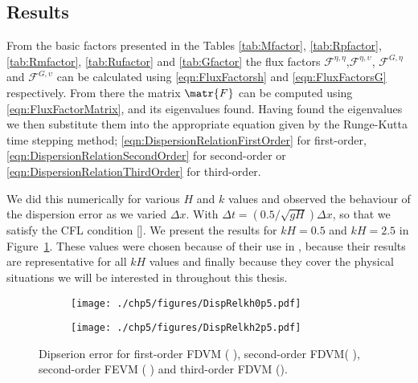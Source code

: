 \subsection{Results}
From the basic factors presented in the Tables \ref{tab:Mfactor}, \ref{tab:Rpfactor}, \ref{tab:Rmfactor}, \ref{tab:Rufactor} and \ref{tab:Gfactor} the flux factors $\mathcal{F}^{\eta,\eta}$,$\mathcal{F}^{\eta,\upsilon}$, $\mathcal{F}^{G,\eta}$ and $\mathcal{F}^{G,\upsilon}$
can be calculated using \eqref{eqn:FluxFactorsh} and \eqref{eqn:FluxFactorsG} respectively. From there the matrix $\matr{F}$ can be computed using \eqref{eqn:FluxFactorMatrix}, and its eigenvalues found. Having found the eigenvalues we then substitute them into the appropriate equation given by the Runge-Kutta time stepping method; \eqref{eqn:DispersionRelationFirstOrder} for first-order, \eqref{eqn:DispersionRelationSecondOrder} for second-order or \eqref{eqn:DispersionRelationThirdOrder} for third-order. 

We did this numerically for various $H$ and $k$ values and observed the behaviour of the dispersion error as we varied $\Delta x$. With $\Delta t =   \left( 0.5 / \sqrt{gH} \right) {\Delta x} $, so that we satisfy the CFL condition []. We present the results for $kH = 0.5$ and $kH = 2.5$ in Figure~\ref{fig:DispErrMeth1}. These values were chosen because of their use in \cite{Filippini-etal-2016-381}, because their results are representative for all $kH$ values and finally because they cover the physical situations we will be interested in throughout this thesis.

\begin{figure}
	\centering
	\begin{subfigure}{0.5\textwidth}
		\texttt{[image: ./chp5/figures/DispRelkh0p5.pdf]}
	\end{subfigure}%
	\begin{subfigure}{0.5\textwidth}
		\texttt{[image: ./chp5/figures/DispRelkh2p5.pdf]}
	\end{subfigure}
	\caption{Dipserion error for first-order FDVM ({\color{green!60!black} \solidrule}), second-order FDVM({\color{red} \solidrule}), second-order FEVM ({\color{blue} \solidrule})  and third-order FDVM ({\solidrule}).}
	\label{fig:DispErrMeth1}
\end{figure}

